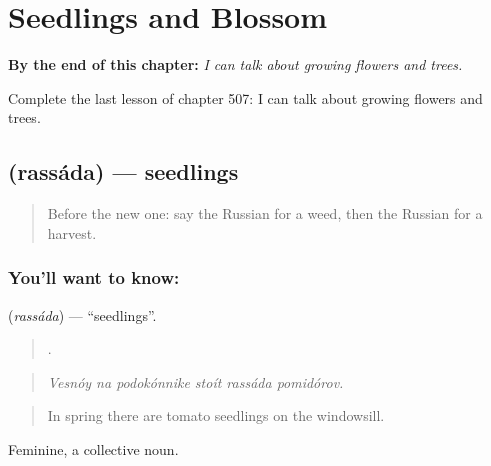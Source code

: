 
\chapter{Seedlings and Blossom}
\label{ch:ru-seedlings-and-blossom}

\begin{chapteropening}
\textbf{By the end of this chapter:} \emph{I can talk about growing flowers and trees.}

Complete the last lesson of chapter 507: I can talk about growing flowers and trees.
\end{chapteropening}

\section[\texorpdfstring{\ru{рассада} (rassáda)}{рассада (rassáda)}]{ (rassáda) — seedlings}

\label{lesson:RU-C507-rassada}



\begin{quote}
Before the new one: say the Russian for a weed, then the Russian for a harvest.
\end{quote}

\subsection*{You'll want to know: }
\textbf{} (\emph{rassáda}) — \textquotedblleft{}seedlings\textquotedblright{}.

\begin{quote}
     .
\end{quote}

\begin{quote}
\emph{Vesnóy na podokónnike stoít rassáda pomidórov.}
\end{quote}

\begin{quote}
In spring there are tomato seedlings on the windowsill.
\end{quote}

Feminine, a collective noun.

